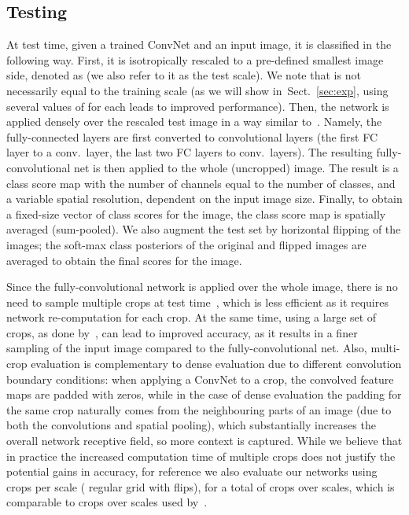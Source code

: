 \documentclass{article} \usepackage{iclr2015,times}
\newcommand{\sref}[1]{Sect.~\ref{#1}}
\begin{document}
\subsection{Testing}
\label{sec:test}
At test time, given a trained ConvNet and an input image, it is classified in the following way. 
First, it is isotropically rescaled to a pre-defined smallest image side, denoted as  (we also refer to it as the test scale).
We note that  is not necessarily equal to the training scale  (as we will show in~\sref{sec:exp},
using several values of  for each  leads to improved performance).
Then, the network is applied densely over the rescaled test image in a way similar to~\citep{Sermanet14}. Namely, the fully-connected layers are first converted to convolutional layers (the first FC layer to a  conv.\ layer, the last two FC layers to  conv.\ layers). The resulting fully-convolutional net is then applied to the whole (uncropped) image.
The result is a class score map with the number of channels equal to the number of classes, and a variable spatial resolution, dependent
on the input image size. Finally, to obtain a fixed-size vector of class scores for the image, the class score map is spatially averaged (sum-pooled).
We also augment the test set by horizontal flipping of the images; the soft-max class posteriors of the original and flipped images are averaged to obtain
the final scores for the image.

Since the fully-convolutional network is applied over the whole image, there is no need to sample multiple crops at test time~\citep{Krizhevsky12}, which is less efficient as it requires network re-computation for each crop. At the same time, using a large set of crops, as done by~\citet{Szegedy14}, can lead to improved accuracy, as it results in a finer sampling of the input image compared to the fully-convolutional net. 
Also, multi-crop evaluation is complementary to dense evaluation due to different convolution boundary conditions: when applying a ConvNet to a crop, the convolved feature maps are padded with zeros, while 
in the case of dense evaluation the padding for the same crop naturally comes from the neighbouring parts of an image (due to both the convolutions and spatial pooling), which substantially increases the overall network receptive field, so more context is captured.
While we believe that in practice the increased computation time of multiple crops does not justify the potential gains in accuracy, for reference we also evaluate our networks using  crops per scale ( regular grid with  flips), for a total of  crops over  scales, which is comparable to  crops over  scales used by~\citet{Szegedy14}.
\end{document}
